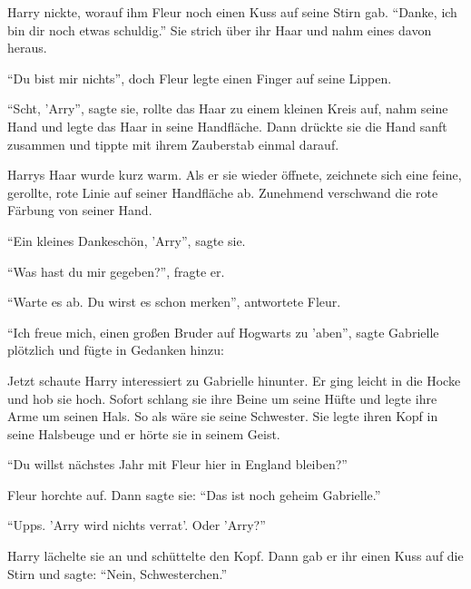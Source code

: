 Harry nickte, worauf ihm Fleur noch einen Kuss auf seine Stirn gab. \enquote{Danke, ich bin dir noch etwas schuldig.} Sie strich über ihr Haar und nahm eines davon heraus.

\enquote{Du bist mir nichts\abs}, doch Fleur legte einen Finger auf seine Lippen.

\enquote{Scht, 'Arry}, sagte sie, rollte das Haar zu einem kleinen Kreis auf, nahm seine Hand und legte das Haar in seine Handfläche. Dann drückte sie die Hand sanft zusammen und tippte mit ihrem Zauberstab einmal darauf.

Harrys Haar wurde kurz warm. Als er sie wieder öffnete, zeichnete sich eine feine, gerollte, rote Linie auf seiner Handfläche ab. Zunehmend verschwand die rote Färbung von seiner Hand.

\enquote{Ein kleines Dankeschön, 'Arry}, sagte sie.

\enquote{Was hast du mir gegeben?}, fragte er.

\enquote{Warte es ab. Du wirst es schon merken}, antwortete Fleur.

\enquote{Ich freue mich, einen großen Bruder auf Hogwarts zu 'aben}, sagte Gabrielle plötzlich und fügte in Gedanken hinzu: 

Jetzt schaute Harry interessiert zu Gabrielle hinunter. Er ging leicht in die Hocke und hob sie hoch. Sofort schlang sie ihre Beine um seine Hüfte und legte ihre Arme um seinen Hals. So als wäre sie seine Schwester. Sie legte ihren Kopf in seine Halsbeuge und er hörte sie in seinem Geist.




\enquote{Du willst nächstes Jahr mit Fleur hier in England bleiben?}

Fleur horchte auf. Dann sagte sie: \enquote{Das ist noch geheim Gabrielle.}

\enquote{Upps. \gst 'Arry wird nichts verrat'. Oder 'Arry?}

Harry lächelte sie an und schüttelte den Kopf. Dann gab er ihr einen Kuss auf die Stirn und sagte: \enquote{Nein, Schwesterchen.}

